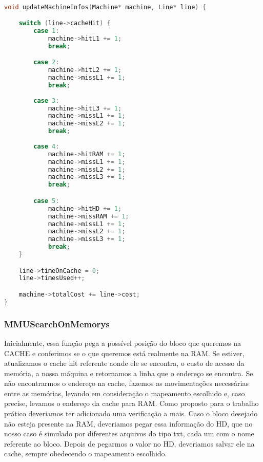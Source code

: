 \documentclass{article}
\begin{document}
\begin{lstlisting}[caption={Função updateMachineInfos},label={lst:cod6},language=C]

void updateMachineInfos(Machine* machine, Line* line) {

    switch (line->cacheHit) {
        case 1:
            machine->hitL1 += 1;
            break;

        case 2:
            machine->hitL2 += 1;
            machine->missL1 += 1;
            break;
        
        case 3:
            machine->hitL3 += 1;
            machine->missL1 += 1;
            machine->missL2 += 1;
            break;
        
        case 4:
            machine->hitRAM += 1;
            machine->missL1 += 1;
            machine->missL2 += 1;
            machine->missL3 += 1;
            break;

        case 5:
            machine->hitHD += 1;
            machine->missRAM += 1;
            machine->missL1 += 1;
            machine->missL2 += 1;
            machine->missL3 += 1;
            break;
    }

    line->timeOnCache = 0;
    line->timesUsed++;

    machine->totalCost += line->cost;
}  

\end{lstlisting}
\clearpage

\subsubsection{MMUSearchOnMemorys}

Inicialmente, essa função pega a possível posição do bloco que queremos na CACHE e conferimos se o
que queremos está realmente na RAM. Se estiver, atualizamos o cache hit referente aonde ele se encontra,
o custo de acesso da memória, a nossa máquina e retornamos a linha que o endereço se encontra. Se não encontrarmos o 
endereço na cache, fazemos as movimentações necessárias entre as memórias, levando em consideração o mapeamento
escolhido e, caso precise, levamos o endereço da cache para RAM. Como proposto para o trabalho prático deveriamos ter adicionado
uma verificação a mais. Caso o bloco desejado não esteja presente na RAM, deveriamos pegar essa informação do HD, que no nosso caso 
é simulado por diferentes arquivos do tipo txt, cada um com o nome referente ao bloco. Depois de pegarmos o valor no HD, deveriamos 
salvar ele na cache, sempre obedecendo o mapeamento escolhido.
\end{document}
